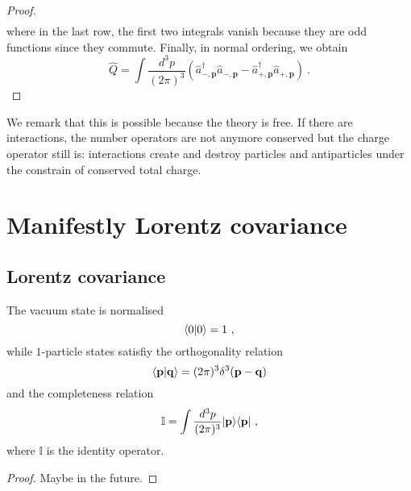 \begin{proof}
\begin{equation*}
\begin{aligned}
        \end{aligned}
        \end{equation*}
        where in the last row, the first two integrals vanish because they are odd functions since they commute. Finally, in normal ordering, we obtain 
        \begin{equation*}
            \hat Q = \int \frac{d^3 p}{(2\pi)^3} ( \hat a_{-, \mathbf p}^\dagger \hat a_{-, \mathbf p} - \hat a_{+, \mathbf p}^\dagger \hat a_{+, \mathbf p} ) ~.
        \end{equation*}
    \end{proof}

    We remark that this is possible because the theory is free. If there are interactions, the number operators are not anymore conserved but the charge operator still is: interactions create and destroy particles and antiparticles under the constrain of conserved total charge.

\chapter{Manifestly Lorentz covariance}

\section{Lorentz covariance}

    The vacuum state is normalised 
    \begin{equation*}
        \langle0\vert0\rangle = 1 ~,
    \end{equation*}
    while $1$-particle states satisfiy the orthogonality relation 
    \begin{equation*}
        \langle\mathbf p\vert\mathbf q\rangle = (2\pi)^3 \delta^3 (\mathbf p - \mathbf q) 
    \end{equation*}
    and the completeness relation 
    \begin{equation*}
        \mathbb I = \int \frac{d^3 p}{(2 \pi)^3} \vert\mathbf p\rangle \langle\mathbf p\vert ~,
    \end{equation*}
    where $\mathbb I$ is the identity operator.
    \begin{proof}
        Maybe in the future.
    \end{proof}

